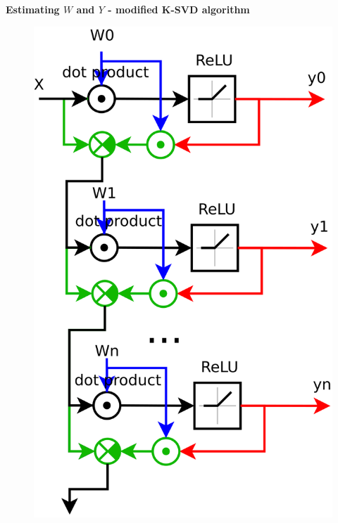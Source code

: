 \documentclass[xcolor=dvipsnames]{beamer}
\begin{document}
\begin{frame}{\bf Estimating $W$ and $Y$ - modified K-SVD algorithm}
\begin{figure}
   \vspace{-210pt}%
   \includegraphics[scale=0.13, right]{../diagrams/features_layer_01.png}
\end{figure}

\end{frame}
\end{document}
